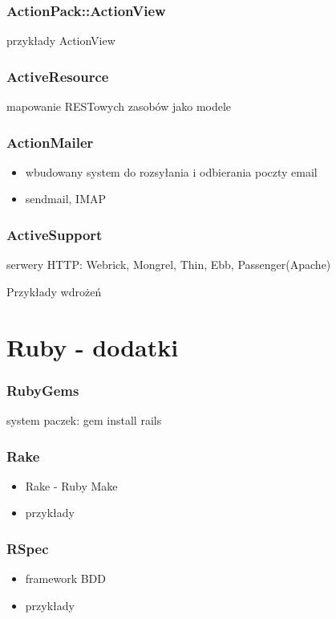 \documentclass[12t]{beamer}
\begin{document}
\begin{frame}
  \frametitle{ActionPack::ActionView}
  przykłady ActionView
\end{frame}

\begin{frame}
  \frametitle{ActiveResource}
  mapowanie RESTowych zasobów jako modele
\end{frame}

\begin{frame}
  \frametitle{ActionMailer}
  \begin{itemize}
  \item wbudowany system do rozsyłania i odbierania poczty email
  \item sendmail, IMAP
  \end{itemize}
\end{frame}

\begin{frame}
  \frametitle{ActiveSupport}
\end{frame}

\begin{frame}
  serwery HTTP: Webrick, Mongrel, Thin, Ebb, Passenger(Apache)
\end{frame}

\begin{frame}
  Przykłady wdrożeń
\end{frame}

\section{Ruby - dodatki}
\begin{frame}
  \frametitle{RubyGems}
  system paczek: gem install rails
\end{frame}

\begin{frame}
  \frametitle{Rake}
  \begin{itemize}
  \item Rake - Ruby Make
  \item przykłady
  \end{itemize}
\end{frame}

\begin{frame}
  \frametitle{RSpec}
  \begin{itemize}
  \item framework BDD
  \item przykłady
  \end{itemize}
\end{frame}
\end{document}
